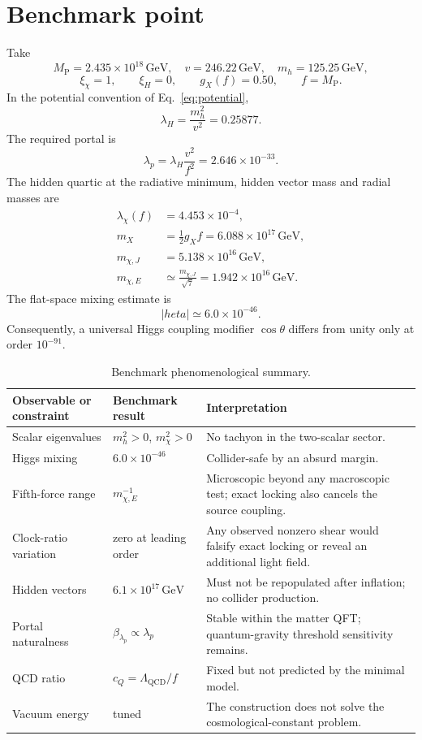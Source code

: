 \documentclass[11pt,a4paper]{article}
\newcommand{\MP}{M_{\mathrm P}}
\newcommand{\QCD}{\mathrm{QCD}}
\begin{document}
\section{Benchmark point}

Take
\[
\MP=2.435\times10^{18}\,\mathrm{GeV},\quad
v=246.22\,\mathrm{GeV},\quad
m_h=125.25\,\mathrm{GeV},
\]
\[
\xi_\chi=1,
\qquad
\xi_H=0,
\qquad
g_X(f)=0.50,
\qquad
f=\MP.
\]
In the potential convention of Eq.~\eqref{eq:potential},
\[
\lambda_H=\frac{m_h^2}{v^2}=0.25877.
\]
The required portal is
\begin{equation}
\boxed{
\lambda_p=\lambda_H\frac{v^2}{f^2}
=2.646\times10^{-33}.
}
\end{equation}
The hidden quartic at the radiative minimum, hidden vector mass and radial masses are
\begin{align}
\lambda_\chi(f)&=4.453\times10^{-4},\\
m_X&=\frac12g_Xf=6.088\times10^{17}\,\mathrm{GeV},\\
m_{\chi,J}&=5.138\times10^{16}\,\mathrm{GeV},\\
m_{\chi,E}&\simeq\frac{m_{\chi,J}}{\sqrt7}
=1.942\times10^{16}\,\mathrm{GeV}.
\end{align}
The flat-space mixing estimate is
\begin{equation}
\boxed{|	heta|\simeq6.0\times10^{-46}.}
\end{equation}
Consequently, a universal Higgs coupling modifier $\cos\theta$ differs from unity only at order $10^{-91}$.

\begin{table}[H]
\centering
\caption{Benchmark phenomenological summary.}
\begin{tabularx}{\textwidth}{@{}p{}p{}X@{}}
\toprule
Observable or constraint & Benchmark result & Interpretation \\
\midrule
Scalar eigenvalues & $m_h^2>0$, $m_\chi^2>0$ & No tachyon in the two-scalar sector. \\
Higgs mixing & $6.0\times10^{-46}$ & Collider-safe by an absurd margin. \\
Fifth-force range & $m_{\chi,E}^{-1}$ & Microscopic beyond any macroscopic test; exact locking also cancels the source coupling. \\
Clock-ratio variation & zero at leading order & Any observed nonzero shear would falsify exact locking or reveal an additional light field. \\
Hidden vectors & $6.1\times10^{17}\,\mathrm{GeV}$ & Must not be repopulated after inflation; no collider production. \\
Portal naturalness & $\beta_{\lambda_p}\propto\lambda_p$ & Stable within the matter QFT; quantum-gravity threshold sensitivity remains. \\
QCD ratio & $c_Q=\Lambda_{\QCD}/f$ & Fixed but not predicted by the minimal model. \\
Vacuum energy & tuned & The construction does not solve the cosmological-constant problem. \\
\bottomrule
\end{tabularx}
\end{table}
\end{document}
